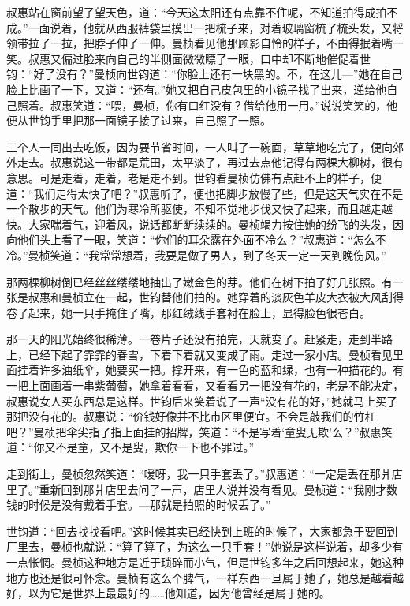 \par 叔惠站在窗前望了望天色，道：“今天这太阳还有点靠不住呢，不知道拍得成拍不成。”一面说着，他就从西服裤袋里摸出一把梳子来，对着玻璃窗梳了梳头发，又将领带拉了一拉，把脖子伸了一伸。曼桢看见他那顾影自怜的样子，不由得抿着嘴一笑。叔惠又偏过脸来向自己的半侧面微微瞟了一眼，口中却不断地催促着世钧：“好了没有？”曼桢向世钧道：“你脸上还有一块黑的。不，在这儿—”她在自己脸上比画了一下，又道：“还有。”她又把自己皮包里的小镜子找了出来，递给他自己照着。叔惠笑道：“喂，曼桢，你有口红没有？借给他用一用。”说说笑笑的，他便从世钧手里把那一面镜子接了过来，自己照了一照。
\par 三个人一同出去吃饭，因为要节省时间，一人叫了一碗面，草草地吃完了，便向郊外走去。叔惠说这一带都是荒田，太平淡了，再过去点他记得有两棵大柳树，很有意思。可是走着，走着，老是走不到。世钧看曼桢仿佛有点赶不上的样子，便道：“我们走得太快了吧？”叔惠听了，便也把脚步放慢了些，但是这天气实在不是一个散步的天气。他们为寒冷所驱使，不知不觉地步伐又快了起来，而且越走越快。大家喘着气，迎着风，说话都断断续续的。曼桢竭力按住她的纷飞的头发，因向他们头上看了一眼，笑道：“你们的耳朵露在外面不冷么？”叔惠道：“怎么不冷。”曼桢笑道：“我常常想着，我要是做了男人，到了冬天一定一天到晚伤风。”
\par 那两棵柳树倒已经丝丝缕缕地抽出了嫩金色的芽。他们在树下拍了好几张照。有一张是叔惠和曼桢立在一起，世钧替他们拍的。她穿着的淡灰色羊皮大衣被大风刮得卷了起来，她一只手掩住了嘴，那红绒线手套衬在脸上，显得脸色很苍白。
\par 那一天的阳光始终很稀薄。一卷片子还没有拍完，天就变了。赶紧走，走到半路上，已经下起了霏霏的春雪，下着下着就又变成了雨。走过一家小店。曼桢看见里面挂着许多油纸伞，她要买一把。撑开来，有一色的蓝和绿，也有一种描花的。有一把上面画着一串紫葡萄，她拿着看看，又看看另一把没有花的，老是不能决定，叔惠说女人买东西总是这样。世钧后来笑着说了一声“没有花的好，”她就马上买了那把没有花的。叔惠说：“价钱好像并不比市区里便宜。不会是敲我们的竹杠吧？”曼桢把伞尖指了指上面挂的招牌，笑道：“不是写着‘童叟无欺’么？”叔惠笑道：“你又不是童，又不是叟，欺你一下也不罪过。”
\par 走到街上，曼桢忽然笑道：“嗳呀，我一只手套丢了。”叔惠道：“一定是丢在那爿店里了。”重新回到那爿店里去问了一声，店里人说并没有看见。曼桢道：“我刚才数钱的时候是没有戴着手套。—那就是拍照的时候丢了。”
\par 世钧道：“回去找找看吧。”这时候其实已经快到上班的时候了，大家都急于要回到厂里去，曼桢也就说：“算了算了，为这么一只手套！”她说是这样说着，却多少有一点怅惘。曼桢这种地方是近于琐碎而小气，但是世钧多年之后回想起来，她这种地方也还是很可怀念。曼桢有这么个脾气，一样东西一旦属于她了，她总是越看越好，以为它是世界上最最好的……他知道，因为他曾经是属于她的。
